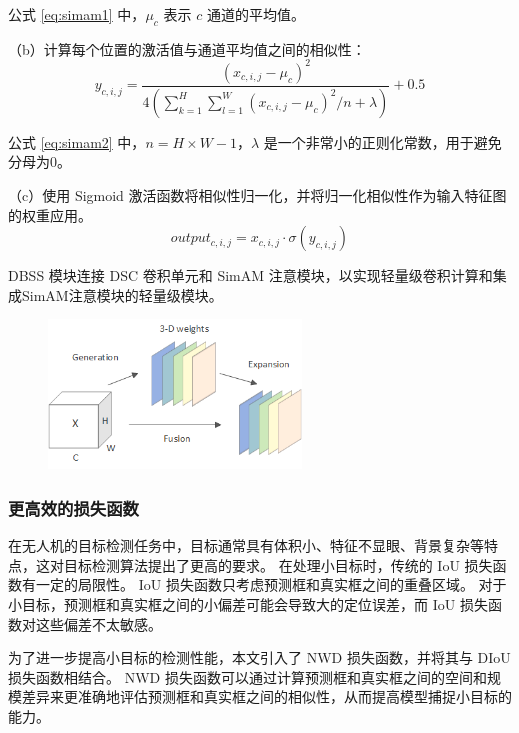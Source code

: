 公式 \ref{eq:simam1} 中，$\mu_c$ 表示 $c$ 通道的平均值。

（b）计算每个位置的激活值与通道平均值之间的相似性：
\begin{equation}
    \label{eq:simam2}
    y_{c,i,j} = \frac{(x_{c,i,j}-\mu_c)^2}{4\left(\sum_{k=1}^{H}\sum_{l=1}^{W}(x_{c,i,j}-\mu_c)^2/n+\lambda \right)}+0.5
\end{equation}

公式 \ref{eq:simam2} 中，$n={H}\times{W}-1$，$\lambda$ 是一个非常小的正则化常数，用于避免分母为$0$。

（c）使用 Sigmoid 激活函数将相似性归一化，并将归一化相似性作为输入特征图的权重应用。
\begin{equation}
    \label{eq:simam3}
    output_{c,i,j} = x_{c,i,j} \cdot \sigma(y_{c,i,j})
\end{equation}

DBSS 模块连接 DSC 卷积单元和 SimAM 注意模块，以实现轻量级卷积计算和集成SimAM注意模块的轻量级模块。

\begin{figure}[htbp]
    \centering
    \includegraphics[width=0.6\textwidth]{../figure/SimAM.png}
    \captionsetup{font=footnotesize}
    \label{fig:SimAM}
\end{figure}

\subsubsection{更高效的损失函数}

在无人机的目标检测任务中，目标通常具有体积小、特征不显眼、背景复杂等特点，这对目标检测算法提出了更高的要求。 在处理小目标时，传统的 IoU 损失函数有一定的局限性。
IoU 损失函数只考虑预测框和真实框之间的重叠区域。 对于小目标，预测框和真实框之间的小偏差可能会导致大的定位误差，而 IoU 损失函数对这些偏差不太敏感。

为了进一步提高小目标的检测性能，本文引入了 NWD 损失函数，并将其与 DIoU 损失函数相结合。
NWD 损失函数可以通过计算预测框和真实框之间的空间和规模差异来更准确地评估预测框和真实框之间的相似性，从而提高模型捕捉小目标的能力。

